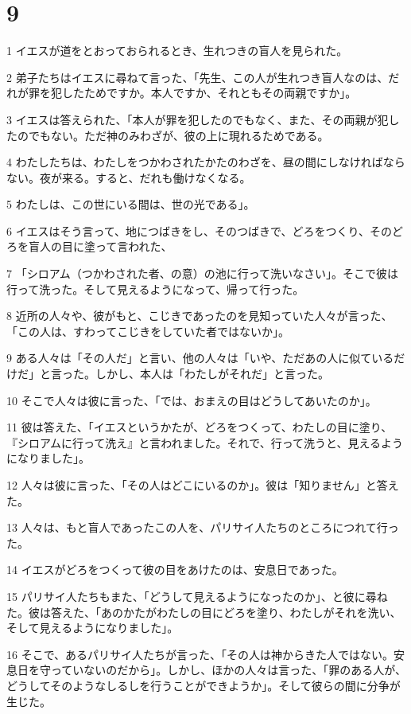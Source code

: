\chapter{9}

\par 1 イエスが道をとおっておられるとき、生れつきの盲人を見られた。
\par 2 弟子たちはイエスに尋ねて言った、「先生、この人が生れつき盲人なのは、だれが罪を犯したためですか。本人ですか、それともその両親ですか」。
\par 3 イエスは答えられた、「本人が罪を犯したのでもなく、また、その両親が犯したのでもない。ただ神のみわざが、彼の上に現れるためである。
\par 4 わたしたちは、わたしをつかわされたかたのわざを、昼の間にしなければならない。夜が来る。すると、だれも働けなくなる。
\par 5 わたしは、この世にいる間は、世の光である」。
\par 6 イエスはそう言って、地につばきをし、そのつばきで、どろをつくり、そのどろを盲人の目に塗って言われた、
\par 7 「シロアム（つかわされた者、の意）の池に行って洗いなさい」。そこで彼は行って洗った。そして見えるようになって、帰って行った。
\par 8 近所の人々や、彼がもと、こじきであったのを見知っていた人々が言った、「この人は、すわってこじきをしていた者ではないか」。
\par 9 ある人々は「その人だ」と言い、他の人々は「いや、ただあの人に似ているだけだ」と言った。しかし、本人は「わたしがそれだ」と言った。
\par 10 そこで人々は彼に言った、「では、おまえの目はどうしてあいたのか」。
\par 11 彼は答えた、「イエスというかたが、どろをつくって、わたしの目に塗り、『シロアムに行って洗え』と言われました。それで、行って洗うと、見えるようになりました」。
\par 12 人々は彼に言った、「その人はどこにいるのか」。彼は「知りません」と答えた。
\par 13 人々は、もと盲人であったこの人を、パリサイ人たちのところにつれて行った。
\par 14 イエスがどろをつくって彼の目をあけたのは、安息日であった。
\par 15 パリサイ人たちもまた、「どうして見えるようになったのか」、と彼に尋ねた。彼は答えた、「あのかたがわたしの目にどろを塗り、わたしがそれを洗い、そして見えるようになりました」。
\par 16 そこで、あるパリサイ人たちが言った、「その人は神からきた人ではない。安息日を守っていないのだから」。しかし、ほかの人々は言った、「罪のある人が、どうしてそのようなしるしを行うことができようか」。そして彼らの間に分争が生じた。
